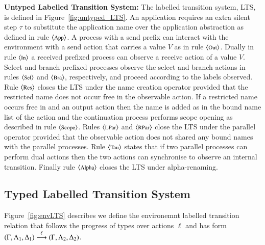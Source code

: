 {\bf Untyped Labelled Transition System:}
The labelled transition system, LTS, is defined in Figure~\ref{fig:untyped_LTS}.
An application requires an extra silent step $\tau$ to substitute
the application name over the application abstraction as defined
in rule ${\footnotesize \langle \textrm{App} \rangle}$.
A process with a send prefix can interact with the environment with a send
action that carries a value $V$ as in rule ${\footnotesize \langle \textrm{Out} \rangle}$.
Dually in rule ${\footnotesize \langle \textrm{In} \rangle}$
a received prefixed process can observe a receive action of a value $V$.
Select and branch prefixed processes observe the select
and branch actions in rules ${\footnotesize \langle \textrm{Sel} \rangle}$ and ${\footnotesize \langle \textrm{Bra} \rangle}$, respectively,
and proceed according to the labels observed.
Rule ${\footnotesize \langle \textrm{Res} \rangle}$ closes the LTS under the name creation
operator provided that the restricted name does not occur free in the observable action.
If a restricted name occurs free in and an output action 
then the name is added as in the bound name list of the action
and the continuation process performs scope opening as described in rule ${\footnotesize \langle \textrm{Scope} \rangle}$.
Rules ${\footnotesize \langle \textrm{LPar} \rangle}$ and ${\footnotesize \langle \textrm{RPar} \rangle}$ close the LTS under the parallel operator 
provided that the observable action does not shared any bound names with the 
parallel processes.
Rule ${\footnotesize \langle \textrm{Tau} \rangle}$ states that if two parallel processes can perform dual actions
then the two actions  can synchronise to observe an internal transition. 
Finally rule ${\footnotesize \langle \textrm{Alpha} \rangle}$ closes  the LTS under alpha-renaming.

\subsection{Typed Labelled Transition System}



Figure~\ref{fig:envLTS} describes we define 
the environemnt labelled transition relation that
follows the progress of types over actions $\ell$ and has form
$(\Gamma, \Lambda_1, \Delta_1) \stackrel{\ell}{\longrightarrow} (\Gamma, \Lambda_2, \Delta_2)$.

